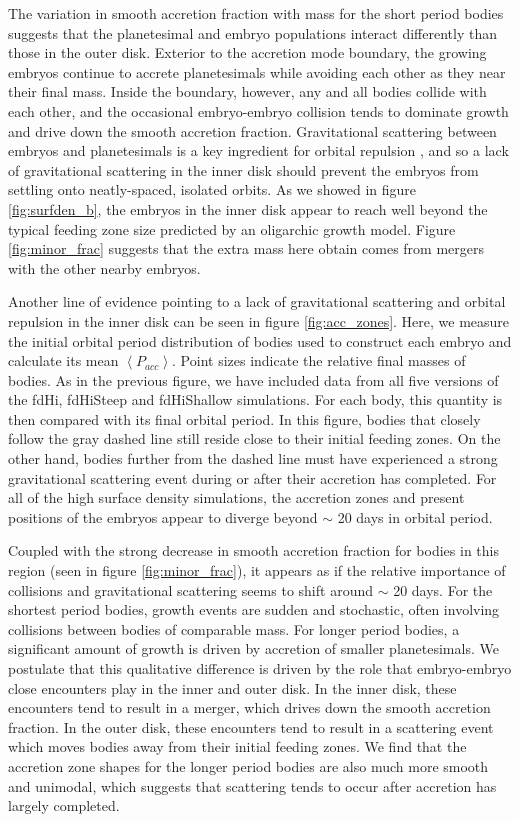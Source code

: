 The variation in smooth accretion fraction with mass for the short period bodies suggests that the planetesimal and embryo populations interact differently than those in the outer disk. Exterior to the accretion mode boundary, the growing embryos continue to accrete planetesimals while avoiding each other as they near their final mass. Inside the boundary, however, any and all bodies collide with each other, and the occasional embryo-embryo collision tends to dominate growth and drive down the smooth accretion fraction. Gravitational scattering between embryos and planetesimals is a key ingredient for orbital repulsion \cite{kokubo98}, and so a lack of gravitational scattering in the inner disk should prevent the embryos from settling onto neatly-spaced, isolated orbits. As we showed in figure \ref{fig:surfden_b}, the embryos in the inner disk appear to reach well beyond the typical feeding zone size predicted by an oligarchic growth model. Figure \ref{fig:minor_frac} suggests that the extra mass here obtain comes from mergers with the other nearby embryos.

Another line of evidence pointing to a lack of gravitational
scattering and orbital repulsion in the inner disk can be seen in
figure \ref{fig:acc_zones}. Here, we measure the initial orbital period distribution of bodies used to construct each embryo and calculate its mean $\left<  P_{acc} \right>$. Point sizes indicate the relative final masses of bodies. As in the previous figure, we have included data from all five versions of the fdHi, fdHiSteep and fdHiShallow simulations. For each body, this quantity is then compared with its final orbital period. In this figure, bodies that closely follow the gray dashed line still reside close to their initial feeding zones. On the other hand, bodies further from the dashed line must have experienced a strong gravitational scattering event during or after their accretion has completed. For all of the high surface density simulations, the accretion zones and present positions of the embryos appear to diverge beyond $\sim$ 20 days in orbital period.

Coupled with the strong decrease in smooth accretion fraction for bodies in this region (seen in figure \ref{fig:minor_frac}), it appears as if the relative importance of collisions and gravitational scattering seems to shift around $\sim$ 20 days. For the shortest period bodies, growth events are sudden and stochastic, often involving collisions between bodies of comparable mass. For longer period bodies, a significant amount of growth is driven by accretion of smaller planetesimals. We postulate that this qualitative difference is driven by the role that embryo-embryo close encounters play in the inner and outer disk. In the inner disk, these encounters tend to result in a merger, which drives down the smooth accretion fraction. In the outer disk, these encounters tend to result in a scattering event which moves bodies away from their initial feeding zones. We find that the accretion zone shapes for the longer period bodies are also much more smooth and unimodal, which suggests that scattering tends to occur after accretion has largely completed.

